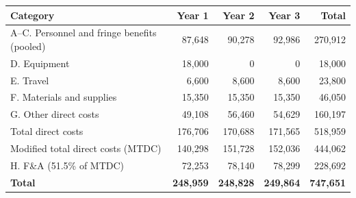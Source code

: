 \begin{tabular}{@{}lrrrr@{}}
\toprule
\textbf{Category} & \textbf{Year 1} & \textbf{Year 2} & \textbf{Year 3} & \textbf{Total} \\
\midrule
A--C. Personnel and fringe benefits (pooled) & 87,648 & 90,278 & 92,986 & 270,912 \\
%
%
D. Equipment & 18,000 & 0 & 0 & 18,000 \\
E. Travel & 6,600 & 8,600 & 8,600 & 23,800 \\
F. Materials and supplies & 15,350 & 15,350 & 15,350 & 46,050 \\
G. Other direct costs & 49,108 & 56,460 & 54,629 & 160,197 \\
\midrule
Total direct costs & 176,706 & 170,688 & 171,565 & 518,959 \\
Modified total direct costs (MTDC) & 140,298 & 151,728 & 152,036 & 444,062 \\
H. F\&A (51.5\% of MTDC) & 72,253 & 78,140 & 78,299 & 228,692 \\
\midrule
\textbf{Total} & \textbf{248,959} & \textbf{248,828} & \textbf{249,864} & \textbf{747,651} \\
\bottomrule
\end{tabular}
